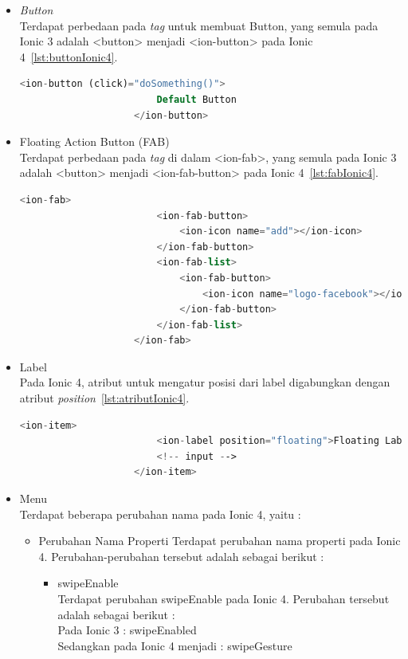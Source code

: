 \begin{enumerate}
\begin{enumerate}
\begin{itemize}
			\begin{itemize}
				\item {\it Button} \\
				Terdapat perbedaan pada {\it tag} untuk membuat Button, yang semula pada Ionic 3 adalah <button> menjadi <ion-button> pada Ionic 4~\ref{lst:buttonIonic4}.
				\begin{lstlisting}[language=php, label={lst:buttonIonic4}, caption=Penggunaan Button pada Ionic 4]
					<ion-button (click)="doSomething()">
						Default Button
					</ion-button>
				\end{lstlisting}

				\item Floating Action Button (FAB) \\
				Terdapat perbedaan pada {\it tag} di dalam <ion-fab>, yang semula pada Ionic 3 adalah <button> menjadi <ion-fab-button> pada Ionic 4~\ref{lst:fabIonic4}.
				\begin{lstlisting}[language=php, label={lst:fabIonic4}, caption=Penggunaan Floating Action Button pada Ionic 4]
					<ion-fab>
						<ion-fab-button>
							<ion-icon name="add"></ion-icon>
						</ion-fab-button>
						<ion-fab-list>
							<ion-fab-button>
								<ion-icon name="logo-facebook"></ion-icon>
							</ion-fab-button>
  						</ion-fab-list>
					</ion-fab>
				\end{lstlisting}

				\item Label \\
				Pada Ionic 4, atribut untuk mengatur posisi dari label digabungkan dengan atribut {\it position}~\ref{lst:atributIonic4}.
				\begin{lstlisting}[language=php, label={lst:atributIonic4}, caption=Penggunaan Atribut {\it Position} pada Ionic 4]
					<ion-item>
						<ion-label position="floating">Floating Label</ion-label>
						<!-- input -->
					</ion-item>
				\end{lstlisting}

				\item Menu \\
				Terdapat beberapa perubahan nama pada Ionic 4, yaitu :
				\begin{itemize}
					\item Perubahan Nama Properti
					Terdapat perubahan nama properti pada Ionic 4. Perubahan-perubahan tersebut adalah sebagai berikut : 
						\begin{itemize}
							\item swipeEnable \\
							Terdapat perubahan swipeEnable pada Ionic 4. Perubahan tersebut adalah sebagai berikut : \\
							Pada Ionic 3 : swipeEnabled \\
							Sedangkan pada Ionic 4 menjadi : swipeGesture


\end{itemize}
\end{itemize}
\end{itemize}
\end{itemize}
\end{enumerate}
\end{enumerate}
